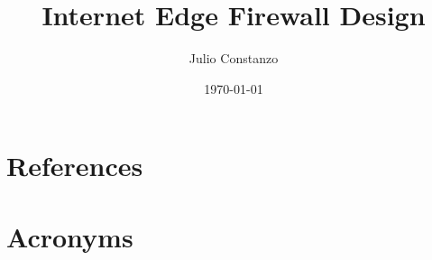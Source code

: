 \documentclass[PMO,authoryear,toc,lsstdraft]{lsstdoc}
\title{Internet Edge Firewall Design}
\author{%
Julio Constanzo
}
\date{\today}
\begin{document}
\maketitle










\appendix
\section{References} \label{sec:bib}
\renewcommand{\refname}{} %


\section{Acronyms} \label{sec:acronyms}

\end{document}
